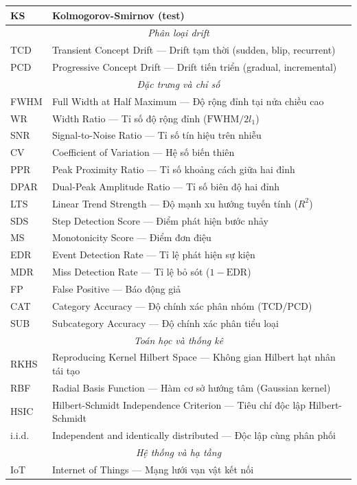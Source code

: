 \begin{longtable}[c]{|l|p{12cm}|}
	KS & Kolmogorov-Smirnov (test) \\
	\hline
	\multicolumn{2}{|c|}{\textit{Phân loại drift}} \\
	\hline
	TCD & Transient Concept Drift --- Drift tạm thời (sudden, blip, recurrent) \\
	PCD & Progressive Concept Drift --- Drift tiến triển (gradual, incremental) \\
	\hline
	\multicolumn{2}{|c|}{\textit{Đặc trưng và chỉ số}} \\
	\hline
	FWHM & Full Width at Half Maximum --- Độ rộng đỉnh tại nửa chiều cao \\
	WR & Width Ratio --- Tỉ số độ rộng đỉnh ($\text{FWHM} / 2l_1$) \\
	SNR & Signal-to-Noise Ratio --- Tỉ số tín hiệu trên nhiễu \\
	CV & Coefficient of Variation --- Hệ số biến thiên \\
	PPR & Peak Proximity Ratio --- Tỉ số khoảng cách giữa hai đỉnh \\
	DPAR & Dual-Peak Amplitude Ratio --- Tỉ số biên độ hai đỉnh \\
	LTS & Linear Trend Strength --- Độ mạnh xu hướng tuyến tính ($R^2$) \\
	SDS & Step Detection Score --- Điểm phát hiện bước nhảy \\
	MS & Monotonicity Score --- Điểm đơn điệu \\
	EDR & Event Detection Rate --- Tỉ lệ phát hiện sự kiện \\
	MDR & Miss Detection Rate --- Tỉ lệ bỏ sót ($1 - \text{EDR}$) \\
	FP & False Positive --- Báo động giả \\
	CAT & Category Accuracy --- Độ chính xác phân nhóm (TCD/PCD) \\
	SUB & Subcategory Accuracy --- Độ chính xác phân tiểu loại \\
	\hline
	\multicolumn{2}{|c|}{\textit{Toán học và thống kê}} \\
	\hline
	RKHS & Reproducing Kernel Hilbert Space --- Không gian Hilbert hạt nhân tái tạo \\
	RBF & Radial Basis Function --- Hàm cơ sở hướng tâm (Gaussian kernel) \\
	HSIC & Hilbert-Schmidt Independence Criterion --- Tiêu chí độc lập Hilbert-Schmidt \\
	i.i.d. & Independent and identically distributed --- Độc lập cùng phân phối \\
	\hline
	\multicolumn{2}{|c|}{\textit{Hệ thống và hạ tầng}} \\
	\hline
	IoT & Internet of Things --- Mạng lưới vạn vật kết nối \\
	\hline
\end{longtable}
